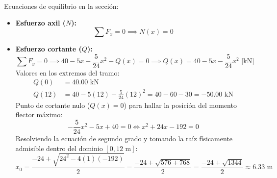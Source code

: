 Ecuaciones de equilibrio en la sección:
\begin{itemize}
    \item \textbf{Esfuerzo axil ($N$):}
          \begin{equation}
              \sum F_x = 0 \implies \boxed{N(x) = 0}
          \end{equation}

    \item \textbf{Esfuerzo cortante ($Q$):}
          \begin{equation}
              \sum F_y = 0 \implies 40 - 5x - \frac{5}{24}x^2 - Q(x) = 0 \implies \boxed{Q(x) = 40 - 5x - \frac{5}{24}x^2\text{ [kN]}}
          \end{equation}
          Valores en los extremos del tramo:
          \begin{align*}
              Q(0)  & = 40.00\text{ kN}                                                   \\
              Q(12) & = 40 - 5(12) - \frac{5}{24}(12)^2 = 40 - 60 - 30 = -50.00\text{ kN}
          \end{align*}
          Punto de cortante nulo ($Q(x) = 0$) para hallar la posición del momento flector máximo:
          \begin{equation}
              -\frac{5}{24}x^2 - 5x + 40 = 0 \iff x^2 + 24x - 192 = 0
          \end{equation}
          Resolviendo la ecuación de segundo grado y tomando la raíz físicamente admisible dentro del dominio $[0, 12\text{ m}]$:
          \begin{equation}
              x_0 = \frac{-24 + \sqrt{24^2 - 4(1)(-192)}}{2} = \frac{-24 + \sqrt{576 + 768}}{2} = \frac{-24 + \sqrt{1344}}{2} \approx \boxed{6.33\text{ m}}
          \end{equation}


\end{itemize}
